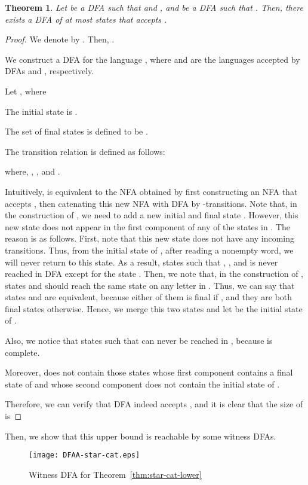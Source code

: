 \documentclass[10pt]{article}
\newtheorem{theorem}{Theorem}
\begin{document}
\begin{theorem}\label{thm:star-cat-upper}
Let  be a DFA such that  and , and  be a DFA such that .
Then, there exists a DFA of at most  states that accepts .
\end{theorem}
\begin{proof}
We denote  by . Then, .

We construct a DFA  for the language , where  and  are the languages accepted by DFAs  and , respectively.

Let , where


The initial state  is .

The set of final states is defined to be .

The transition relation  is defined as follows:

where, , , and .

    Intuitively,  is equivalent to the NFA  obtained by first constructing an NFA  that accepts , then catenating this new NFA with DFA  by -transitions.
    Note that, in the construction of , we need to add a new initial and final state .
    However, this new state does not appear in the first component of any of the states in .
    The reason is as follows.
    First, note that this new state does not have any incoming transitions.
    Thus, from the initial state  of , after reading a nonempty word, we will never return to this state.
    As a result, states  such that , , and  is never reached in DFA  except for the state .
    Then, we note that, in the construction of , states  and  should reach the same state on any letter in .
    Thus, we can say that states  and  are equivalent, because either of them is final if , and they are both final states otherwise.
    Hence, we merge this two states and let  be the initial state of .

    Also, we notice that states  such that  can never be reached in , because  is complete.

    Moreover,  does not contain those states whose first component contains a final state of  and whose second component does not contain the initial state of .

    Therefore, we can verify that DFA  indeed accepts , and it is clear that the size of  is
 
\end{proof}

Then, we show that this upper bound is reachable by some witness DFAs.

\begin{figure}[ht]
  \begin{center}
  \texttt{[image: DFAA-star-cat.eps]}
  \end{center}
  \caption{Witness DFA  for Theorem~\ref{thm:star-cat-lower}}
\label{fig:DFAA-star-cat}
\end{figure}
\end{document}
